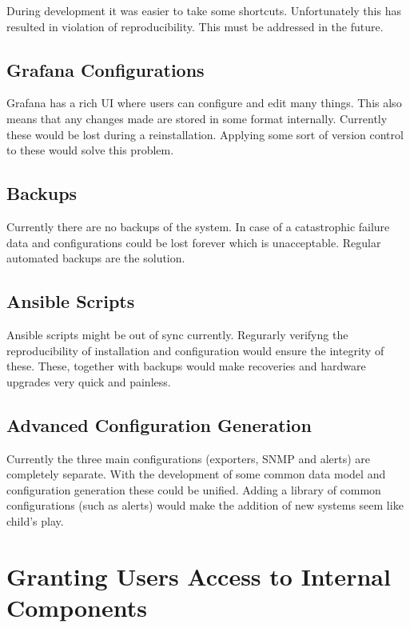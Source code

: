 During development it was easier to take some shortcuts. Unfortunately this has
resulted in violation of reproducibility. This must be addressed in the future.

\subsection{Grafana Configurations}

Grafana has a rich UI where users can configure and edit many things. This also
means that any changes made are stored in some format internally. Currently
these would be lost during a reinstallation. Applying some sort of version
control to these would solve this problem.

\subsection{Backups}

Currently there are no backups of the system. In case of a catastrophic failure
data and configurations could be lost forever which is unacceptable. Regular
automated backups are the solution.

\subsection{Ansible Scripts}

Ansible scripts might be out of sync currently. Regurarly verifyng the
reproducibility of installation and configuration would ensure the integrity of
these. These, together with backups would make recoveries and hardware upgrades
very quick and painless.

\subsection{Advanced Configuration Generation \label{advconf}}

Currently the three main configurations (exporters, SNMP and alerts) are
completely separate. With the development of some common data model and
configuration generation these could be unified. Adding a library of common
configurations (such as alerts) would make the addition of new systems seem
like child's play.

\section{Granting Users Access to Internal Components}

